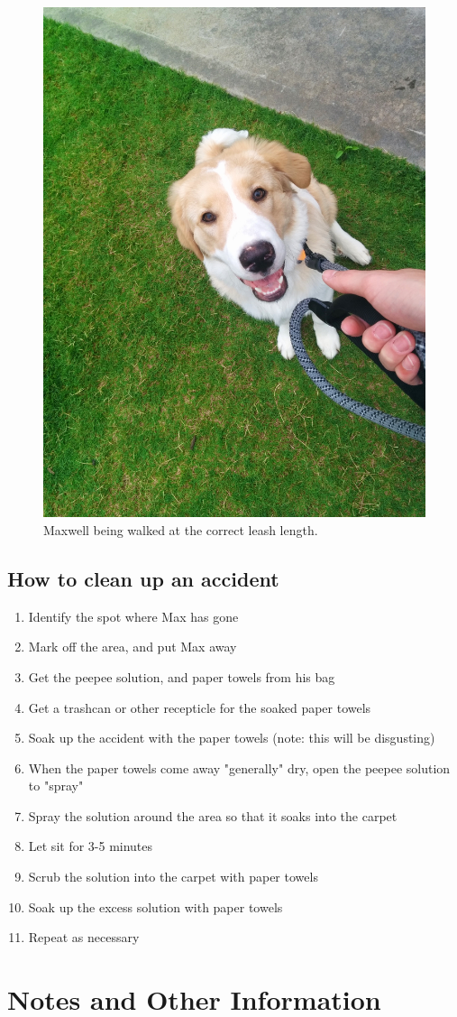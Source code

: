 \documentclass[pdftex,12pt]{article}
\begin{document}
\begin{figure}[H]
    \centering
    \includegraphics[width=.35\textwidth]{./images/how_to/walk_max/short_leash.jpg}
    \caption{Maxwell being walked at the correct leash length.}
    \label{fig:short_leash}
\end{figure}

\subsection{How to clean up an accident}
\begin{enumerate}\label{itm:how_to_clean_accident}
    \item Identify the spot where Max has gone
    \item Mark off the area, and put Max away
    \item Get the peepee solution, and paper towels from his bag
    \item Get a trashcan or other recepticle for the soaked paper towels
    \item Soak up the accident with the paper towels (note: this will be disgusting)
    \item When the paper towels come away "generally" dry, open the peepee solution to "spray"
    \item Spray the solution around the area so that it soaks into the carpet
    \item Let sit for 3-5 minutes
    \item Scrub the solution into the carpet with paper towels
    \item Soak up the excess solution with paper towels
    \item Repeat as necessary
\end{enumerate}


\newpage
\section{Notes and Other Information}
\end{document}
